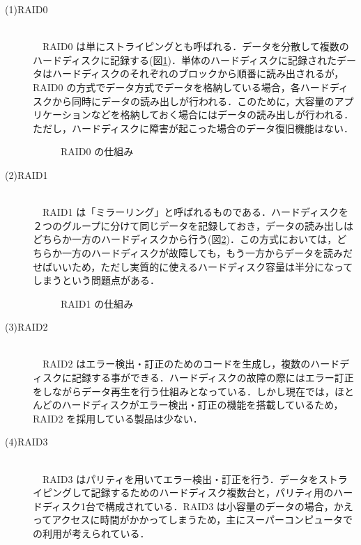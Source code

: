 \documentclass[a4j,titlepage]{jarticle}
\begin{document}
\begin{description}

\item[(1)RAID0]\mbox{}\\
　RAID0 は単にストライピングとも呼ばれる．データを分散して複数のハードディスクに記録する(図\ref{fig:raid0})．単体のハードディスクに記録されたデータはハードディスクのそれぞれのブロックから順番に読み出されるが，RAID0 の方式でデータ方式でデータを格納している場合，各ハードディスクから同時にデータの読み出しが行われる．このために，大容量のアプリケーションなどを格納しておく場合にはデータの読み出しが行われる．ただし，ハードディスクに障害が起こった場合のデータ復旧機能はない．

  \begin{figure}[htbp]
    \begin{center}
      \caption{RAID0 の仕組み}
     \label{fig:raid0}
   \end{center}
  \end{figure}


\item[(2)RAID1]\mbox{}\\
　RAID1 は「ミラーリング」と呼ばれるものである．ハードディスクを２つのグループに分けて同じデータを記録しておき，データの読み出しはどちらか一方のハードディスクから行う(図\ref{fig:raid1})．この方式においては，どちらか一方のハードディスクが故障しても，もう一方からデータを読みだせばいいため，ただし実質的に使えるハードディスク容量は半分になってしまうという問題点がある．

  \begin{figure}[htbp]
    \begin{center}
      \caption{RAID1 の仕組み}
     \label{fig:raid1}
   \end{center}
  \end{figure}


\item[(3)RAID2]\mbox{}\\
　RAID2 はエラー検出・訂正のためのコードを生成し，複数のハードディスクに記録する事ができる．ハードディスクの故障の際にはエラー訂正をしながらデータ再生を行う仕組みとなっている．しかし現在では，ほとんどのハードディスクがエラー検出・訂正の機能を搭載しているため，RAID2 を採用している製品は少ない．
  
\item[(4)RAID3]\mbox{}\\
　RAID3 はパリティを用いてエラー検出・訂正を行う．データをストライピングして記録するためのハードディスク複数台と，パリティ用のハードディスク1台で構成されている．RAID3 は小容量のデータの場合，かえってアクセスに時間がかかってしまうため，主にスーパーコンピュータでの利用が考えられている．
  

\end{description}
\end{document}
